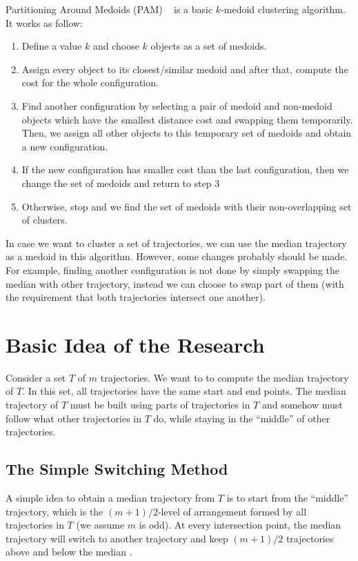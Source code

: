 Partitioning Around Medoids (PAM) ~\cite{Kaufman:2005} is a basic $k$-medoid clustering algorithm.
It works as follow:
\begin{enumerate}
\item
Define a value $k$ and choose $k$ objects as a set of medoids.
\item
Assign every object to its closest/similar medoid and after that, compute the cost for the whole configuration.  
\item
Find another configuration by selecting a pair of medoid and non-medoid objects which have the smallest distance cost and swapping them temporarily.
Then, we assign all other objects to this temporary set of medoids and obtain a new configuration.
\item
If the new configuration has smaller cost than the last configuration, then we change the set of medoids and return to step 3
\item
Otherwise, stop and we find the set of medoids with their non-overlapping set of clusters.
\end{enumerate}

In case we want to cluster a set of trajectories, we can use the median trajectory as a medoid in this algorithm.
However, some changes probably should be made.
For example, finding another configuration is not done by simply swapping the median with other trajectory, instead we can choose to swap part of them (with the requirement that both trajectories intersect one another).

\section{Basic Idea of the Research}
\label{sec:basic_idea}

Consider a set $T$ of $m$ trajectories.
We want to to compute the median trajectory of $T$.
In this set, all trajectories have the same start and end points.
The median trajectory of $T$ must be built using parts of trajectories in $T$ and somehow must follow what other trajectories in $T$ do, while staying in the ``middle'' of other trajectories.

\subsection{The Simple Switching Method }
\label{sec:switch}

A simple idea to obtain a median trajectory from $T$ is to start from the ``middle'' trajectory, which is the $(m+1)/2$-level of arrangement formed by all trajectories in $T$ (we assume $m$ is odd).
At every intersection point, the median trajectory will switch to another trajectory and keep $(m+1)/2$ trajectories above and below the median \cite{Buchin:2010}.

